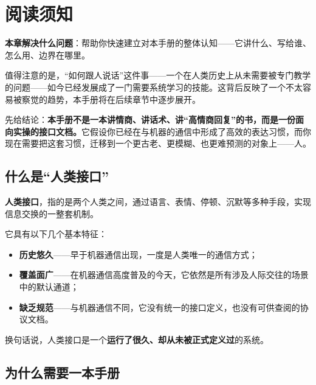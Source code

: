 \chapter{阅读须知}

\begin{guideblock}
\textbf{本章解决什么问题}：帮助你快速建立对本手册的整体认知——它讲什么、写给谁、怎么用、边界在哪里。
\end{guideblock}

值得注意的是，“如何跟人说话”这件事——一个在人类历史上从未需要被专门教学的问题——如今已经发展成了一门需要系统学习的技能。这背后反映了一个不太容易被察觉的趋势，本手册将在后续章节中逐步展开。

先给结论：\textbf{本手册不是一本讲情商、讲话术、讲“高情商回复”的书，而是一份面向实操的接口文档。}它假设你已经在与机器的通信中形成了高效的表达习惯，而你现在需要把这套习惯，迁移到一个更古老、更模糊、也更难预测的对象上——人。

\hcirule

\section{什么是“人类接口”}

\textbf{人类接口}，指的是两个人类之间，通过语言、表情、停顿、沉默等多种手段，实现信息交换的一整套机制。

它具有以下几个基本特征：

\begin{itemize}[leftmargin=2.4em, itemsep=0.3em, topsep=0.3em, parsep=0.2em]
\item \textbf{历史悠久}——早于机器通信出现，一度是人类唯一的通信方式；
\item \textbf{覆盖面广}——在机器通信高度普及的今天，它依然是所有涉及人际交往的场景中的默认通道；
\item \textbf{缺乏规范}——与机器通信不同，它没有统一的接口定义，也没有可供查阅的协议文档。
\end{itemize}

换句话说，人类接口是一个\textbf{运行了很久、却从未被正式定义过}的系统。

\section{为什么需要一本手册}


